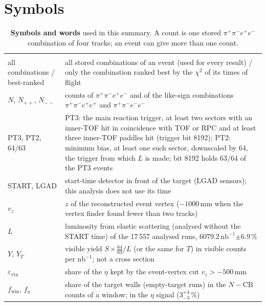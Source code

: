 \documentclass[11pt,a4paper]{article}
\renewcommand{\arraystretch}{1.15}
\newcommand{\pip}{\ensuremath{\pi^{+}}\xspace}
\newcommand{\pim}{\ensuremath{\pi^{-}}\xspace}
\newcommand{\pipi}{\ensuremath{\pi^{+}\pi^{-}}\xspace}
\newcommand{\ppee}{\ensuremath{\pi^{+}\pi^{-}e^{+}e^{-}}\xspace}
\newcommand{\nbinv}{\ensuremath{\mathrm{nb}^{-1}}\xspace}
\newcommand{\vz}{\ensuremath{v_z}\xspace}
\newcommand{\fwin}{\ensuremath{f_{\mathrm{win}}}\xspace}
\newcommand{\feta}{\ensuremath{f_\eta}\xspace}
\begin{document}
\section{Symbols}
\label{sec:nota}
{\footnotesize
\setlength{\tabcolsep}{4pt}
\renewcommand{\arraystretch}{1.08}
\begin{longtable}{@{}>{\raggedright\arraybackslash}p{3.3cm} >{\raggedright\arraybackslash}p{\dimexpr\textwidth-3.3cm-2\tabcolsep\relax}@{}}
\caption{\textbf{Symbols and words} used in this summary. A count is one stored \pip\pim$e^+e^-$ combination of four tracks; an event can
give more than one count.}
\label{tab:nota}\\
\toprule
\multicolumn{2}{@{}l}{\textbf{Samples and normalisation}} \\
all combinations / best-ranked & all stored combinations of an event (used for every result) / only the combination ranked best by the $\chi^2$ of its times of flight \\
$N$, $N_{++}$, $N_{--}$ & counts of \ppee and of the like-sign combinations $\pipi e^+e^+$ and $\pipi e^-e^-$ \\
PT3, PT2, 64/63 & PT3: the main reaction trigger, at least two sectors with an inner-TOF hit in coincidence with TOF or RPC and at
   least three inner-TOF paddles hit (trigger bit 8192); PT2: minimum bias, at least one such sector, downscaled by 64, the trigger from
   which $L$ is made; bit 8192 holds 63/64 of the PT3 events \\
START, LGAD & start-time detector in front of the target (LGAD sensors); this analysis does not use its time \\
\vz & $z$ of the reconstructed event vertex ($-1000$\,mm when the vertex finder found fewer than two tracks) \\
$L$ & luminosity from elastic scattering (analysed without the START time) of the 17\,557 analysed runs, 6079.2\,\nbinv $\pm6.9$\,\% \\
$Y$, $Y_T$ & visible yield $S\times\frac{64}{63}/L$ (or the same for $T$) in visible counts per \nbinv; not a cross section \\
$\varepsilon_{\mathrm{vtx}}$ & share of the $\eta$ kept by the event-vertex cut $\vz>-500$\,mm \\
\fwin, \feta & share of the target walls (empty-target runs) in the $N-\mathrm{CB}$ counts of a window; in the $\eta$ signal ($3^{+4}_{-3}$\,\%) \\

\end{longtable}}
\end{document}
